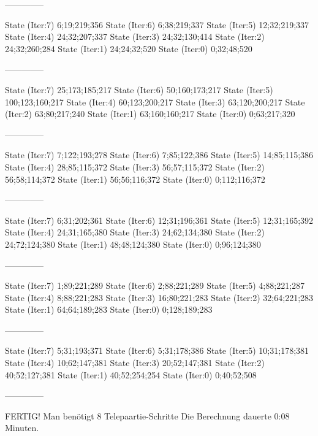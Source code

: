 \documentclass[a4paper,10pt,ngerman]{scrartcl}
\begin{document}
\begin{lstcs}
--------------

State (Iter:7) {6;19;219;356}
State (Iter:6) {6;38;219;337}
State (Iter:5) {12;32;219;337}
State (Iter:4) {24;32;207;337}
State (Iter:3) {24;32;130;414}
State (Iter:2) {24;32;260;284}
State (Iter:1) {24;24;32;520}
State (Iter:0) {0;32;48;520}

--------------

State (Iter:7) {25;173;185;217}
State (Iter:6) {50;160;173;217}
State (Iter:5) {100;123;160;217}
State (Iter:4) {60;123;200;217}
State (Iter:3) {63;120;200;217}
State (Iter:2) {63;80;217;240}
State (Iter:1) {63;160;160;217}
State (Iter:0) {0;63;217;320}

--------------

State (Iter:7) {7;122;193;278}
State (Iter:6) {7;85;122;386}
State (Iter:5) {14;85;115;386}
State (Iter:4) {28;85;115;372}
State (Iter:3) {56;57;115;372}
State (Iter:2) {56;58;114;372}
State (Iter:1) {56;56;116;372}
State (Iter:0) {0;112;116;372}

--------------

State (Iter:7) {6;31;202;361}
State (Iter:6) {12;31;196;361}
State (Iter:5) {12;31;165;392}
State (Iter:4) {24;31;165;380}
State (Iter:3) {24;62;134;380}
State (Iter:2) {24;72;124;380}
State (Iter:1) {48;48;124;380}
State (Iter:0) {0;96;124;380}

--------------

State (Iter:7) {1;89;221;289}
State (Iter:6) {2;88;221;289}
State (Iter:5) {4;88;221;287}
State (Iter:4) {8;88;221;283}
State (Iter:3) {16;80;221;283}
State (Iter:2) {32;64;221;283}
State (Iter:1) {64;64;189;283}
State (Iter:0) {0;128;189;283}

--------------

State (Iter:7) {5;31;193;371}
State (Iter:6) {5;31;178;386}
State (Iter:5) {10;31;178;381}
State (Iter:4) {10;62;147;381}
State (Iter:3) {20;52;147;381}
State (Iter:2) {40;52;127;381}
State (Iter:1) {40;52;254;254}
State (Iter:0) {0;40;52;508}

--------------


FERTIG!
Man benötigt 8 Telepaartie-Schritte
Die Berechnung dauerte 0:08 Minuten.
\end{lstcs}
\end{document}
